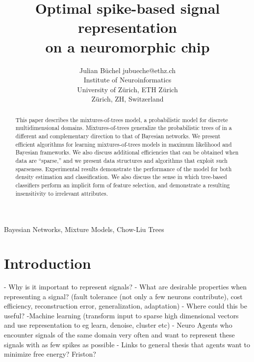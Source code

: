\documentclass[twoside,11pt]{article}
\begin{document}
\title{Optimal spike-based signal representation\\on a neuromorphic chip}

\author{\name Julian B\"uchel \email jubueche@ethz.ch \\
       \addr Institute of Neuroinformatics\\
       University of Z\"urich, ETH Z\"urich \\
       Z\"urich, ZH, Switzerland}

\editor{}

\maketitle

\tableofcontents
\newpage

\begin{abstract}%
This paper describes the mixtures-of-trees model, a probabilistic 
model for discrete multidimensional domains.  Mixtures-of-trees 
generalize the probabilistic trees of \citet{chow:68}
in a different and complementary direction to that of Bayesian networks.
We present efficient algorithms for learning mixtures-of-trees 
models in maximum likelihood and Bayesian frameworks. 
We also discuss additional efficiencies that can be
obtained when data are ``sparse,'' and we present data 
structures and algorithms that exploit such sparseness.
Experimental results demonstrate the performance of the 
model for both density estimation and classification. 
We also discuss the sense in which tree-based classifiers
perform an implicit form of feature selection, and demonstrate
a resulting insensitivity to irrelevant attributes.
\end{abstract}

\begin{keywords}
  Bayesian Networks, Mixture Models, Chow-Liu Trees
\end{keywords}

\section{Introduction}

- Why is it important to represent signals?
- What are desirable properties when representing a signal?
(fault tolerance (not only a few neurons contribute), cost efficiency, reconstruction error,
generalization, adaptation)
- Where could this be useful? 
-Machine learning (transform input to sparse high dimensional vectors
and use representation to eg learn, denoise, cluster etc)
- Neuro Agents who encounter signals of the same domain very often and want to represent
these signals with as few spikes as possible
- Links to general thesis that agents want to minimize free energy? Friston?
\end{document}
